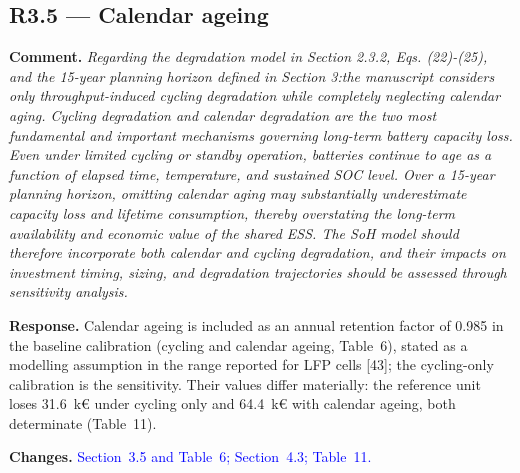 \documentclass[11pt]{article}
\newcommand{\rcomment}[1]{\par\medskip\noindent\textbf{Comment.} \textit{#1}\par\smallskip}
\newcommand{\rresponse}[1]{\noindent\textbf{Response.} #1\par\smallskip}
\newcommand{\rchanges}[1]{\noindent\textbf{Changes.} \textcolor{blue}{#1}\par\medskip}
\begin{document}
\subsection*{R3.5 --- Calendar ageing}
\rcomment{
Regarding the degradation model in Section 2.3.2, Eqs. (22)-(25), and the 15-year planning horizon defined in Section 3:the manuscript considers only throughput-induced cycling degradation while completely neglecting calendar aging. Cycling degradation and calendar degradation are the two most fundamental and important mechanisms governing long-term battery capacity loss. Even under limited cycling or standby operation, batteries continue to age as a function of elapsed time, temperature, and sustained SOC level. Over a 15-year planning horizon, omitting calendar aging may substantially underestimate capacity loss and lifetime consumption, thereby overstating the long-term availability and economic value of the shared ESS. The SoH model should therefore incorporate both calendar and cycling degradation, and their impacts on investment timing, sizing, and degradation trajectories should be assessed through sensitivity analysis.
}
\rresponse{Calendar ageing is included as an annual retention factor of 0.985 in the baseline calibration (cycling and calendar ageing, Table~6), stated as a modelling assumption in the range reported for LFP cells [43]; the cycling-only calibration is the sensitivity. Their values differ materially: the reference unit loses 31.6~k\euro{} under cycling only and 64.4~k\euro{} with calendar ageing, both determinate (Table~11).}
\rchanges{Section~3.5 and Table~6; Section~4.3; Table~11.}
\end{document}
